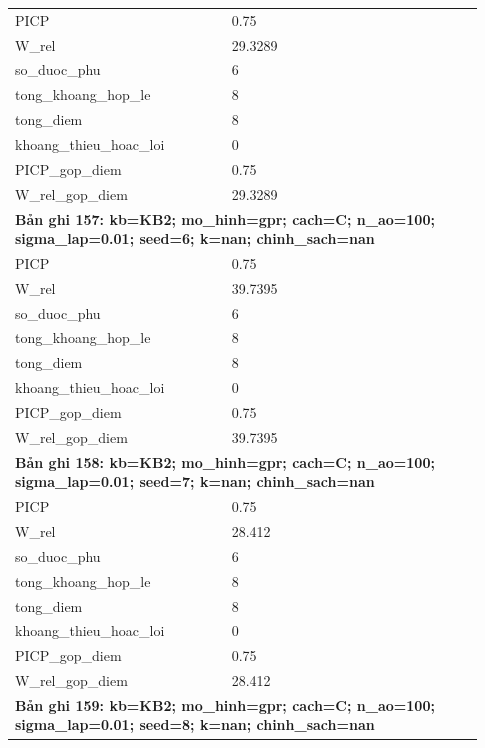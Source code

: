 \begin{longtable}{p{0.43\linewidth}p{0.50\linewidth}}
PICP & 0.75 \\
W\_\allowbreak rel & 29.3289 \\
so\_\allowbreak duoc\_\allowbreak phu & 6 \\
tong\_\allowbreak khoang\_\allowbreak hop\_\allowbreak le & 8 \\
tong\_\allowbreak diem & 8 \\
khoang\_\allowbreak thieu\_\allowbreak hoac\_\allowbreak loi & 0 \\
PICP\_\allowbreak gop\_\allowbreak diem & 0.75 \\
W\_\allowbreak rel\_\allowbreak gop\_\allowbreak diem & 29.3289 \\
\midrule
\multicolumn{2}{p{0.95\linewidth}}{\textbf{Bản ghi 157: kb=KB2; mo\_hinh=gpr; cach=C; n\_ao=100; sigma\_lap=0.01; seed=6; k=nan; chinh\_sach=nan}} \\
PICP & 0.75 \\
W\_\allowbreak rel & 39.7395 \\
so\_\allowbreak duoc\_\allowbreak phu & 6 \\
tong\_\allowbreak khoang\_\allowbreak hop\_\allowbreak le & 8 \\
tong\_\allowbreak diem & 8 \\
khoang\_\allowbreak thieu\_\allowbreak hoac\_\allowbreak loi & 0 \\
PICP\_\allowbreak gop\_\allowbreak diem & 0.75 \\
W\_\allowbreak rel\_\allowbreak gop\_\allowbreak diem & 39.7395 \\
\midrule
\multicolumn{2}{p{0.95\linewidth}}{\textbf{Bản ghi 158: kb=KB2; mo\_hinh=gpr; cach=C; n\_ao=100; sigma\_lap=0.01; seed=7; k=nan; chinh\_sach=nan}} \\
PICP & 0.75 \\
W\_\allowbreak rel & 28.412 \\
so\_\allowbreak duoc\_\allowbreak phu & 6 \\
tong\_\allowbreak khoang\_\allowbreak hop\_\allowbreak le & 8 \\
tong\_\allowbreak diem & 8 \\
khoang\_\allowbreak thieu\_\allowbreak hoac\_\allowbreak loi & 0 \\
PICP\_\allowbreak gop\_\allowbreak diem & 0.75 \\
W\_\allowbreak rel\_\allowbreak gop\_\allowbreak diem & 28.412 \\
\midrule
\multicolumn{2}{p{0.95\linewidth}}{\textbf{Bản ghi 159: kb=KB2; mo\_hinh=gpr; cach=C; n\_ao=100; sigma\_lap=0.01; seed=8; k=nan; chinh\_sach=nan}} \\

\end{longtable}
